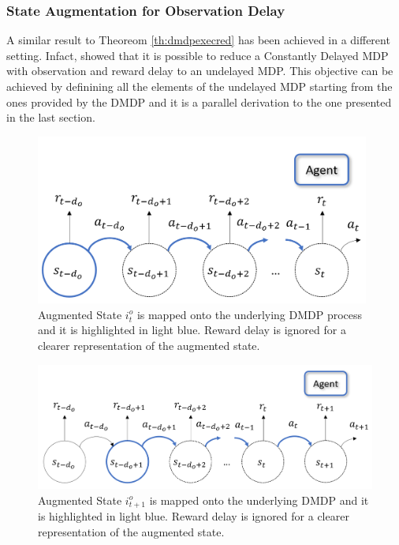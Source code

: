             \subsubsection{State Augmentation for Observation Delay}
                A similar result to Theoreom \ref{th:dmdpexecred} has been achieved in a different setting. Infact,  showed that it is possible to reduce a Constantly Delayed MDP with observation and reward delay to an undelayed MDP. This objective can be achieved by definining all the elements of the undelayed MDP starting from the ones provided by the DMDP and it is a parallel derivation to the one presented in the last section. 
                
                \begin{figure}[t]
                    \centering
                    \includegraphics[width=11cm, keepaspectratio]{images/dmdp/augmented_i_o.png}
                    \caption{Augmented State $i_t^o$ is mapped onto the underlying DMDP process and it is highlighted in light blue. Reward delay is ignored for a clearer representation of the augmented state.}
                    \label{fig:augmented_i_o}
                \end{figure}
                \begin{figure}[t]
                    \centering
                    \includegraphics[width=13cm, keepaspectratio]{images/dmdp/augmented_i_o_next.png}
                    \caption{Augmented State $i_{t+1}^o$ is mapped onto the underlying DMDP and it is highlighted in light blue. Reward delay is ignored for a clearer representation of the augmented state.}
                    \label{fig:augmented_i_o_next}
                \end{figure}
                
